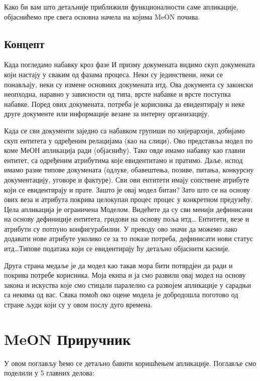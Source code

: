 \documentclass[a4paper,10pt,english]{report}
\let\sphinxpxdimen\pdfpxdimen\else\newdimen\sphinxpxdimen
\begin{document}
Како би вам што детаљније приближили функционалности саме апликације, објаснићемо пре свега основна начела на којима MeON почива.


\section{Концепт}
\label{\detokenize{uvod/koncept:uvod}}\label{\detokenize{uvod/koncept:id1}}\label{\detokenize{uvod/koncept::doc}}
\noindent\sphinxincludegraphics[width=600\sphinxpxdimen]{{nab_dok}.png}

Када погледамо набавку кроз фазе И призму докумената видимо скуп докумената који настају у сваким од фазама процеса. Неки су јединствени, неки се понављају, неки су измене основних докумената итд. Ова документа су законски неопходна, наравно у зависности од типа, врсте набавке и врсте поступка набавке. Поред ових докумената, потреба је корисника да евидентирају и неке друге документе или информације везане за интерну организацију.

\noindent\sphinxincludegraphics[width=600\sphinxpxdimen]{{nab_hijer}.png}

Када се сви документи заједно са набавком групиши по хијерархији, добијамо скуп ентитета у одређеним релацијама (као на слици). Ово представља модел по коме МеОН апликација ради (објаснићу). Тако овде имамо набавку као главни ентитет, са одређеним атрибутима које евидентитамо и пратимо. Даље, испод имамо разне типове докумената (одлуке, обавештења, позиве, питања, конкурсну документацију, уговоре и фактуре). Сви ови ентитети имају сопствене атрибуте који се евидентирају и прате. Зашто је овај модел битан? Зато што се на основу ових веза и атрибута покрива целокупан процес процес у конкретном предузећу. Цела апликација је ограничена Моделом. Видећете да су сви менији дефинисани на основу дефиниције ентитета, гридови на основу поља итд… Ентитети, везе и атрибути су потпуно конфигурабилни. У преводу ово значи да можемо лако додавати нове атрибуте уколико се за то показе потреба, дефинисати нови статус итд…Типове података који се евидентирају ћу детаљно објаснити касније.

Друга страна медаље је да модел као такав мора бити потврдјен да ради и покрива потребе корисника. Моја екипа и ја смо развили овај модел на основу закона и искуства које смо стицали паралелно са развојем апликације у сарадњи са некима од вас. Свака помоћ око оцене модела је добродошла поготово од стране људи који су у овом послу дуго времена.


\chapter{MeON Приручник}
\label{\detokenize{prirucnik/index:meon}}\label{\detokenize{prirucnik/index::doc}}
У овом поглављу ћемо се детаљно бавити коришћењем апликације. Поглавље смо поделили у 5 главних делова:
\end{document}
